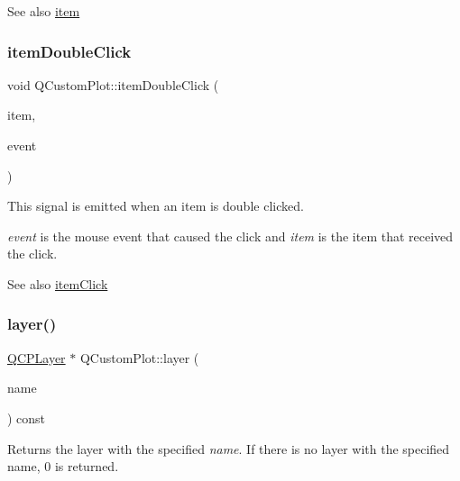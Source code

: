 \begin{DoxySeeAlso}{See also}
\hyperlink{classQCustomPlot_ac042f2e78edd228ccf2f26b7fe215239}{item} 
\end{DoxySeeAlso}
\mbox{\label{classQCustomPlot_ac83aa9f5a3e9bb3efc9cdc763dcd42a6}} 
\subsubsection{\texorpdfstring{item\+Double\+Click}{itemDoubleClick}}
{\footnotesize\ttfamily void Q\+Custom\+Plot\+::item\+Double\+Click (\begin{DoxyParamCaption}\item[{\hyperlink{classQCPAbstractItem}{Q\+C\+P\+Abstract\+Item} $\ast$}]{item,  }\item[{Q\+Mouse\+Event $\ast$}]{event }\end{DoxyParamCaption})\hspace{0.3cm}{\ttfamily [signal]}}

This signal is emitted when an item is double clicked.

{\itshape event} is the mouse event that caused the click and {\itshape item} is the item that received the click.

\begin{DoxySeeAlso}{See also}
\hyperlink{classQCustomPlot_ae16b51f52d2b7aebbc7e3e74e6ff2e4b}{item\+Click} 
\end{DoxySeeAlso}
\mbox{\label{classQCustomPlot_a0a96244e7773b242ef23c32b7bdfb159}} 
\subsubsection{\texorpdfstring{layer()}{layer()}\hspace{0.1cm}{\footnotesize\ttfamily [1/2]}}
{\footnotesize\ttfamily \hyperlink{classQCPLayer}{Q\+C\+P\+Layer} $\ast$ Q\+Custom\+Plot\+::layer (\begin{DoxyParamCaption}\item[{const Q\+String \&}]{name }\end{DoxyParamCaption}) const}

Returns the layer with the specified {\itshape name}. If there is no layer with the specified name, 0 is returned.

